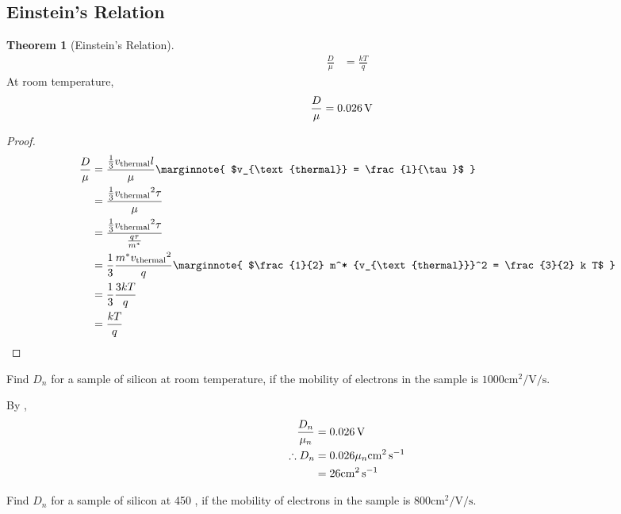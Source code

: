 \documentclass[titlepage, fleqn, a4paper, 12pt, twoside]{article}
\theoremstyle{definition}
\theoremstyle{theorem}
\newtheorem{theorem}{Theorem}
\let\Oldsubsection\subsection
\renewcommand{\subsection}{\FloatBarrier\Oldsubsection}
\begin{document}
\subsection{Einstein's Relation}

\begin{theorem}[Einstein's Relation]
	\begin{align*}
		\frac{D}{\mu} &= \frac{k T}{q}
	\end{align*}
	At room temperature,
	\begin{align*}
		\frac{D}{\mu} &= 0.026 \volt
	\end{align*}
	\label{Einstein's_Relation}
\end{theorem}

\begin{proof}
	\begin{align*}
		\frac{D}{\mu} &= \frac{\frac{1}{3} v_{\text{thermal}} l}{\mu}
		\marginnote
		{
			$v_{\text{thermal}} = \frac{l}{\tau}$
		}\\
		&= \frac{\frac{1}{3} {v_{\text{thermal}}}^2 \tau}{\mu}\\
		&= \frac{\frac{1}{3} {v_{\text{thermal}}}^2 \tau}{\frac{q \tau}{m^*}}\\
		&= \frac{1}{3} \frac{m^* {v_{\text{thermal}}}^2}{q}
		\marginnote
		{
			$\frac{1}{2} m^* {v_{\text{thermal}}}^2 = \frac{3}{2} k T$
		}\\
		&= \frac{1}{3} \frac{3 k T}{q}\\
		&= \frac{k T}{q}
	\end{align*}
\end{proof}

\begin{question}
	Find $D_n$ for a sample of silicon at room temperature, if the mobility of electrons in the sample is $1000 \si{\centi\metre\squared\per\volt\per\second}$.
\end{question}

\begin{solution}
	By ,
	\begin{align*}
		\frac{D_n}{\mu_n} &= 0.026 \volt\\
		\therefore D_n &= 0.026 \mu_n \si{\centi\metre\squared\per\second}\\
		&= 26 \si{\centi\metre\squared\per\second}
	\end{align*}
\end{solution}

\begin{question}
	Find $D_n$ for a sample of silicon at 450 \kelvin, if the mobility of electrons in the sample is $800 \si{\centi\metre\squared\per\volt\per\second}$.
\end{question}
\end{document}
